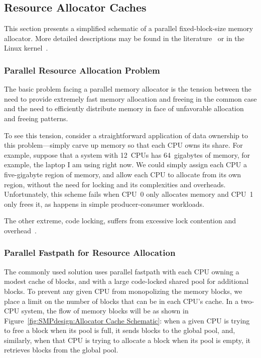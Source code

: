 \subsection{Resource Allocator Caches}
\label{sec:SMPdesign:Resource Allocator Caches}

This section presents a simplified schematic of a parallel fixed-block-size
memory allocator.
More detailed descriptions may be found in the
literature~\cite{McKenney92a,McKenney93,Bonwick01slab,McKenney01e,JasonEvans2011jemalloc,ChrisKennelly2020tcmalloc}
or in the Linux kernel~\cite{Torvalds2.6kernel}.

\subsubsection{Parallel Resource Allocation Problem}

The basic problem facing a parallel memory allocator is the tension
between the need to provide extremely fast memory allocation and
freeing in the common case and the need to efficiently distribute
memory in face of unfavorable allocation and freeing patterns.

To see this tension, consider a straightforward application of
data ownership to this problem---simply carve up memory so that
each CPU owns its share.
For example, suppose that a system with 12~CPUs has 64~gigabytes
of memory, for example, the laptop I am using right now.
We could simply assign each CPU a five-gigabyte region of memory,
and allow each CPU to allocate from its own region, without the need
for locking and its complexities and overheads.
Unfortunately, this scheme fails when CPU~0 only allocates memory and
CPU~1 only frees it, as happens in simple producer-consumer workloads.

The other extreme, code locking, suffers from excessive lock contention
and overhead~\cite{McKenney93}.

\subsubsection{Parallel Fastpath for Resource Allocation}
\label{sec:SMPdesign:Parallel Fastpath for Resource Allocation}

The commonly used solution uses parallel fastpath with each CPU
owning a modest cache of blocks, and with a large code-locked
shared pool for additional blocks.
To prevent any given CPU from monopolizing the memory blocks,
we place a limit on the number of blocks that can be in each CPU's
cache.
In a two-CPU system, the flow of memory blocks will be as shown
in Figure~\ref{fig:SMPdesign:Allocator Cache Schematic}:
when a given CPU is trying to free a block when its pool is full,
it sends blocks to the global pool, and, similarly, when that CPU
is trying to allocate a block when its pool is empty, it retrieves
blocks from the global pool.

